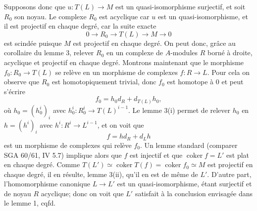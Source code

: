 \documentclass[11pt]{article}
\providecommand{\coker}{\operatorname{coker}}
\providecommand{\coker}{\operatorname{Coker}}
\begin{document}
Supposons donc que $u:T(L)\to M$ est un quasi-isomorphisme surjectif, et soit $R_0$ son noyau. Le complexe $R_0$ est acyclique car $u$ est un quasi-isomorphisme, et il est projectif en chaque degré, car la suite exacte
\[
0\longrightarrow R_0\longrightarrow T(L)\longrightarrow M\longrightarrow0
\]
est scindée puisque $M$ est projectif en chaque degré. On peut donc, grâce au corollaire du lemme 3, relever $R_0$ en un complexe de $A$-modules $R$ borné à droite, acyclique et projectif en chaque degré. Montrons maintenant que le morphisme $f_0:R_0\to T(L)$ se relève en un morphisme de complexes $f:R\to L$. Pour cela on observe que $R_0$ est homotopiquement trivial, donc $f_0$ est homotope à $0$ et peut s'écrire
\[
f_0=h_0d_R+d_{T(L)}h_0,
\]
où $h_0=(h_0^i)_i$ avec $h_0^i:R_0^i\to T(L)^{i-1}$. Le lemme 3(i) permet de relever $h_0$ en $h=(h^i)_i$ avec $h^i:R^i\to L^{i-1}$, et on voit que
\[
f=hd_R+d_Lh
\]
est un morphisme de complexes qui relève $f_0$. Un lemme standard (comparer SGA 60/61, IV 5.7) implique alors que $f$ est injectif et que $\coker f=L'$ est plat en chaque degré. Comme $T(L')\simeq\coker T(f)=\coker f_0\simeq M$ est projectif en chaque degré, il en résulte, lemme 3(ii), qu'il en est de même de $L'$. D'autre part, l'homomorphisme canonique $L\to L'$ est un quasi-isomorphisme, étant surjectif et de noyau $R$ acyclique; donc on voit que $L'$ satisfait à la conclusion envisagée dans le lemme 1, cqfd.
\end{document}
